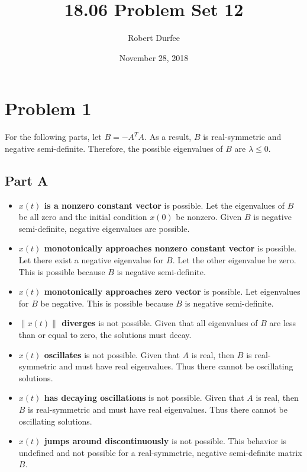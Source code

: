 \documentclass{article}
\title{18.06 Problem Set 12}
\author{Robert Durfee}
\date{November 28, 2018}
\begin{document}
\maketitle

\section*{Problem 1}

For the following parts, let $B = -A^T A$. As a result, $B$ is real-symmetric
and negative semi-definite. Therefore, the possible eigenvalues of $B$ are
$\lambda \leq 0$.

\subsection*{Part A}

\begin{itemize}

  \item {\bf $x(t)$ is a nonzero constant vector} is possible. Let the
  eigenvalues of $B$ be all zero and the initial condition $x(0)$ be nonzero.
  Given $B$ is negative semi-definite, negative eigenvalues are possible.

  \item {\bf $x(t)$ monotonically approaches nonzero constant vector} is
  possible. Let there exist a negative eigenvalue for $B$. Let the other
  eigenvalue be zero. This is possible because $B$ is negative semi-definite.
  
  \item {\bf $x(t)$ monotonically approaches zero vector} is possible. Let
  eigenvalues for $B$ be negative. This is possible because $B$ is negative
  semi-definite.

  \item {\bf $\lVert x(t) \rVert$ diverges} is not possible. Given that all
  eigenvalues of $B$ are less than or equal to zero, the solutions must
  decay.

  \item {\bf $x(t)$ oscillates} is not possible. Given that $A$ is real, then
  $B$ is real-symmetric and must have real eigenvalues. Thus there cannot be
  oscillating solutions.

  \item {\bf $x(t)$ has decaying oscillations} is not possible. Given that
  $A$ is real, then $B$ is real-symmetric and must have real eigenvalues.
  Thus there cannot be oscillating solutions.

  \item {\bf $x(t)$ jumps around discontinuously} is not possible. This
  behavior is undefined and not possible for a real-symmetric, negative
  semi-definite matrix $B$.

\end{itemize}
\end{document}
